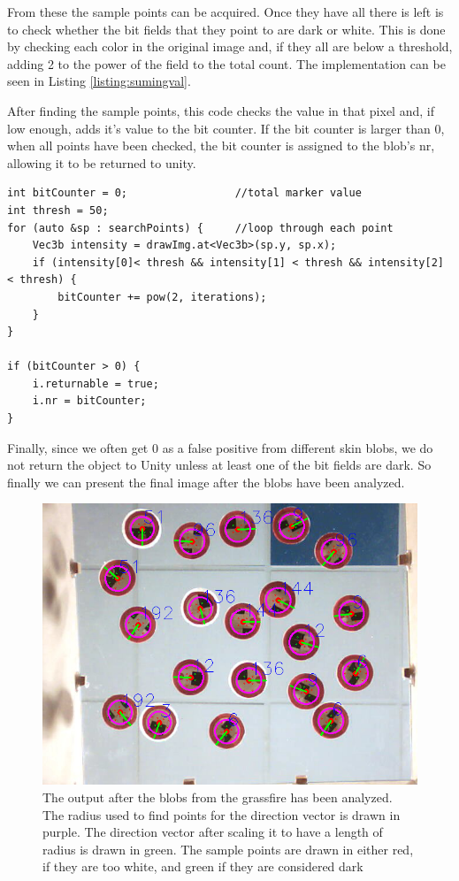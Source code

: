 From these the sample points can be acquired. Once they have all there is left is to check whether the bit fields that they point to are dark or white. This is done by checking each color in the original image and, if they all are below a threshold, adding 2 to the power of the field to the total count. The implementation can be seen in Listing \ref{listing:sumingval}.
 \begin{listing}[H]
 	\caption{After finding the sample points, this code checks the value in that pixel and, if low enough, adds it's value to the bit counter. If the bit counter is larger than 0, when all points have been checked, the bit counter is assigned to the blob's nr, allowing it to be returned to unity.}
 	\begin{verbatim}
int bitCounter = 0;					//total marker value
int thresh = 50;
for (auto &sp : searchPoints) {		//loop through each point
	Vec3b intensity = drawImg.at<Vec3b>(sp.y, sp.x);
	if (intensity[0]< thresh && intensity[1] < thresh && intensity[2] < thresh) {
		bitCounter += pow(2, iterations);
	}
}

if (bitCounter > 0) {
	i.returnable = true;
	i.nr = bitCounter;
}
 	\end{verbatim}
 	\label{listing:sumingval}
\end{listing}
Finally, since we often get 0 as a false positive from different skin blobs, we do not return the object to Unity unless at least one of the bit fields are dark.
So finally we can present the final image after the blobs have been analyzed. 
\begin{figure}[H]
	\centering
	\includegraphics[width=1\linewidth]{figure/Analysis/output.png}
	\caption{The output after the blobs from the grassfire has been analyzed. The radius used to find points for the direction vector is drawn in purple. The direction vector after scaling it to have a length of radius is drawn in green. The sample points are drawn in either red, if they are too white, and green if they are considered dark} 
	\label{fig:output}
\end{figure}


